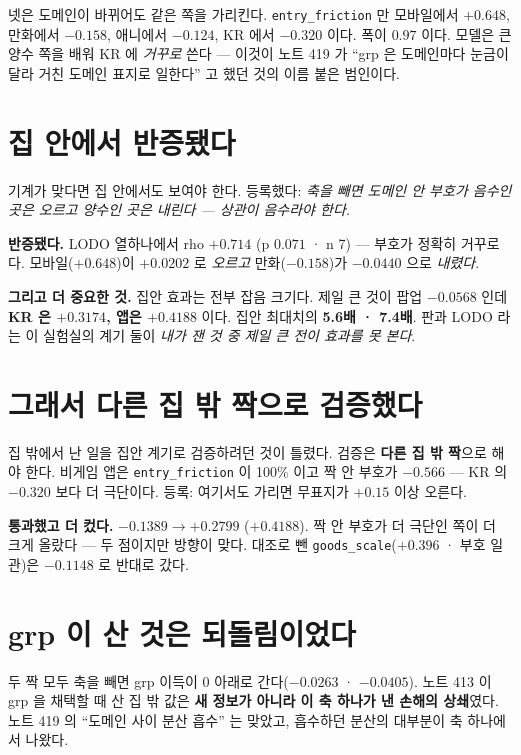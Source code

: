 \documentclass[11pt]{article}
\begin{document}
넷은 도메인이 바뀌어도 같은 쪽을 가리킨다. \texttt{entry\_friction} 만
모바일에서 $+0.648$, 만화에서 $-0.158$, 애니에서 $-0.124$, KR 에서
$-0.320$ 이다. 폭이 $0.97$ 이다. 모델은 큰 양수 쪽을 배워 KR 에 \emph{거꾸로}
쓴다 --- 이것이 노트 419 가 ``grp 은 도메인마다 눈금이 달라 거친 도메인
표지로 일한다'' 고 했던 것의 이름 붙은 범인이다.

\section{집 안에서 반증됐다}

기계가 맞다면 집 안에서도 보여야 한다. 등록했다: \emph{축을 빼면 도메인 안
부호가 음수인 곳은 오르고 양수인 곳은 내린다 --- 상관이 음수라야 한다.}

\textbf{반증됐다.} LODO 열하나에서 rho $\mathbf{+0.714}$ (p $0.071$ · n 7)
--- 부호가 정확히 거꾸로다. 모바일($+0.648$)이 $+0.0202$ 로 \emph{오르고}
만화($-0.158$)가 $-0.0440$ 으로 \emph{내렸다}.

\textbf{그리고 더 중요한 것.} 집안 효과는 전부 잡음 크기다. 제일 큰 것이
팝업 $-0.0568$ 인데 \textbf{KR 은 $+0.3174$, 앱은 $+0.4188$} 이다. 집안
최대치의 \textbf{5.6배 · 7.4배}. 판과 LODO 라는 이 실험실의 계기 둘이
\emph{내가 잰 것 중 제일 큰 전이 효과를 못 본다}.

\section{그래서 다른 집 밖 짝으로 검증했다}

집 밖에서 난 일을 집안 계기로 검증하려던 것이 틀렸다. 검증은 \textbf{다른
집 밖 짝}으로 해야 한다. 비게임 앱은 \texttt{entry\_friction} 이 100\% 이고
짝 안 부호가 $-0.566$ --- KR 의 $-0.320$ 보다 더 극단이다. 등록: 여기서도
가리면 무표지가 $+0.15$ 이상 오른다.

\textbf{통과했고 더 컸다.} $-0.1389 \to +0.2799$ ($+0.4188$). 짝 안 부호가
더 극단인 쪽이 더 크게 올랐다 --- 두 점이지만 방향이 맞다. 대조로 뺀
\texttt{goods\_scale}($+0.396$ · 부호 일관)은 $-0.1148$ 로 반대로 갔다.

\section{grp 이 산 것은 되돌림이었다}

두 짝 모두 축을 빼면 grp 이득이 $0$ 아래로 간다($-0.0263$ · $-0.0405$).
노트 413 이 grp 을 채택할 때 산 집 밖 값은 \textbf{새 정보가 아니라 이 축
하나가 낸 손해의 상쇄}였다. 노트 419 의 ``도메인 사이 분산 흡수'' 는
맞았고, 흡수하던 분산의 대부분이 축 하나에서 나왔다.
\end{document}
